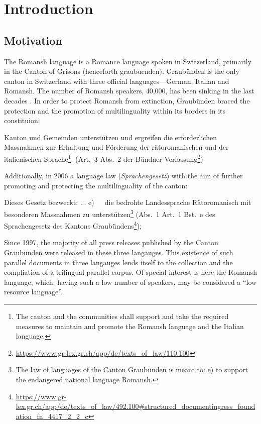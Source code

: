 \chapter{Introduction}
\section{Motivation}
The Romansh language is a Romance language spoken in Switzerland, primarily in the Canton of Grisons (henceforth \gls{graubuenden}). 
Graubünden is the only canton in Switzerland with three official languages---German, Italian and Romansh. 
The number of Romansh speakers, 40,000, has been sinking in the last decades \autocite{bundesamt2020}. 
In order to protect Romansh from extinction, Graubünden braced the protection and the promotion of multilinguality within its borders in its constituion:


\begin{displayquote}
Kanton und Gemeinden unterstützen und ergreifen die erforderlichen Massnahmen zur Erhaltung und Förderung der rätoromanischen und der italienischen Sprache\footnote{The canton and the communities shall support and take the required measures to maintain and promote the Romansh language and the Italian language.}. 
(Art.~3 Abs.~2 der Bündner Verfassung\footnote{\url{https://www.gr-lex.gr.ch/app/de/texts_of_law/110.100}}) 
\end{displayquote}

Additionally, in 2006 a language law (\emph{Sprachengesetz}) with the aim of further promoting and protecting the multilinguality of the canton:
\begin{displayquote}
Dieses Gesetz bezweckt:
...
e)~~~die  bedrohte  Landessprache  Rätoromanisch  mit  besonderen  Massnahmen zu unterstützen\footnote{The law of languages of the Canton Graubünden is meant to: e) to support the endangered national language Romansh.} (Abs.~1 Art.~1 Bst.~e des Sprachengesetz des Kantons Graubündens\footnote{\url{https://www.gr-lex.gr.ch/app/de/texts_of_law/492.100\#structured_documentingress_foundation_fn_4417_2_2_c}}); 
\end{displayquote}


Since 1997, the majority of all press releases published by the Canton Graubünden were released in these three langauges. 
This existence of such parallel documents in three langauges lends itself to the collection and the compliation of a trilingual parallel corpus. 
Of special interest is here the Romansh language, which, having such a low number of speakers, may be considered a  \enquote{low resource language}.


